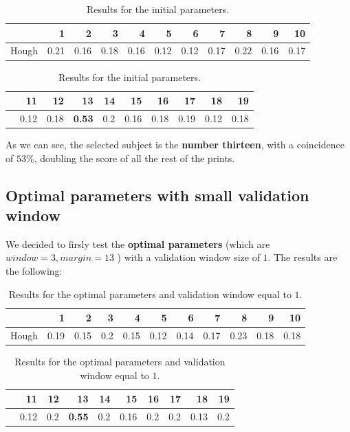 \documentclass[a4paper]{article}
\begin{document}
\begin{table}[H]
  \centering
  \begin{tabular}{lrrrrrrrrrr}

    {} &    1  &    2  &    3  &    4  &    5  &    6  &    7  &    8  &    9  &    10 \\
    \midrule
    Hough &  0.21 &  0.16 &  0.18 &  0.16 &  0.12 &  0.12 &  0.17 &  0.22 &  0.16 &  0.17 \\

    \end{tabular}
    
    \begin{tabular}{lrrrrrrrrr}

    {} &    11 &    12 &    13 &   14 &    15 &    16 &    17 &    18 &    19 \\
    \midrule
     &  0.12 &  0.18 &  \textbf{0.53} &  0.2 &  0.16 &  0.18 &  0.19 &  0.12 &  0.18 \\

    \end{tabular}
    
    \caption{Results for the initial parameters.}

\end{table}


As we can see, the selected subject is the \textbf{number thirteen}, with a coincidence of \(53\%\), doubling the score of all the rest of the prints.

\subsection{Optimal parameters with small validation window}

We decided to firsly test the \textbf{optimal parameters} (which are \(window = 3, margin = 13\) ) with a validation window size of \(1\). The results are the following:

\begin{table}[H]
  \centering
  \begin{tabular}{lrrrrrrrrrr}

    {} &    1  &    2  &   3  &    4  &    5  &    6  &    7  &    8  &    9  &    10 \\
    \midrule
    Hough &  0.19 &  0.15 &  0.2 &  0.15 &  0.12 &  0.14 &  0.17 &  0.23 &  0.18 &  0.18 \\

    \end{tabular}
    
    \begin{tabular}{lrrrrrrrrr}

    {} &    11 &   12 &    13 &   14 &    15 &   16 &   17 &    18 &   19 \\
    \midrule
     &  0.12 &  0.2 &  \textbf{0.55} &  0.2 &  0.16 &  0.2 &  0.2 &  0.13 &  0.2 \\

    \end{tabular}
    
    \caption{Results for the optimal parameters and validation window equal to \(1\).}

\end{table}
\end{document}

